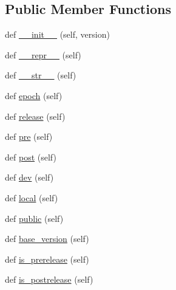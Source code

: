 \subsection*{Public Member Functions}
\begin{DoxyCompactItemize}
\item 
def \hyperlink{classpkg__resources_1_1__vendor_1_1packaging_1_1version_1_1Version_a97ad57a694c484875decb960f85d5b57}{\+\_\+\+\_\+init\+\_\+\+\_\+} (self, version)
\item 
def \hyperlink{classpkg__resources_1_1__vendor_1_1packaging_1_1version_1_1Version_a89c03b05e97a313b8a4909b6549cea3d}{\+\_\+\+\_\+repr\+\_\+\+\_\+} (self)
\item 
def \hyperlink{classpkg__resources_1_1__vendor_1_1packaging_1_1version_1_1Version_a9a90e18e451e2e46f4cecb59e159d3d7}{\+\_\+\+\_\+str\+\_\+\+\_\+} (self)
\item 
def \hyperlink{classpkg__resources_1_1__vendor_1_1packaging_1_1version_1_1Version_a6f8d0c3cac2a93857ef563017000cb05}{epoch} (self)
\item 
def \hyperlink{classpkg__resources_1_1__vendor_1_1packaging_1_1version_1_1Version_a12de2fd47057777158e73ec33f46b1c2}{release} (self)
\item 
def \hyperlink{classpkg__resources_1_1__vendor_1_1packaging_1_1version_1_1Version_a7b69dad2869e679d058877a0d2e74df0}{pre} (self)
\item 
def \hyperlink{classpkg__resources_1_1__vendor_1_1packaging_1_1version_1_1Version_a88160a2c333b4aad6265431a8df0fa1e}{post} (self)
\item 
def \hyperlink{classpkg__resources_1_1__vendor_1_1packaging_1_1version_1_1Version_a15d7987ba238fdc0b6b59566d0631514}{dev} (self)
\item 
def \hyperlink{classpkg__resources_1_1__vendor_1_1packaging_1_1version_1_1Version_a42fcad5b56f4cba8bb585c85b4d823e6}{local} (self)
\item 
def \hyperlink{classpkg__resources_1_1__vendor_1_1packaging_1_1version_1_1Version_aec799e789b1eaf7697167fa8937a059f}{public} (self)
\item 
def \hyperlink{classpkg__resources_1_1__vendor_1_1packaging_1_1version_1_1Version_aca9d11c5fa065f97a1dc0475bc55edf3}{base\+\_\+version} (self)
\item 
def \hyperlink{classpkg__resources_1_1__vendor_1_1packaging_1_1version_1_1Version_a218307c7e6f5e0d40795560b6ec905d5}{is\+\_\+prerelease} (self)
\item 
def \hyperlink{classpkg__resources_1_1__vendor_1_1packaging_1_1version_1_1Version_af9bfffa937f9cf6206e4bd6c183bbb2d}{is\+\_\+postrelease} (self)

\end{DoxyCompactItemize}
